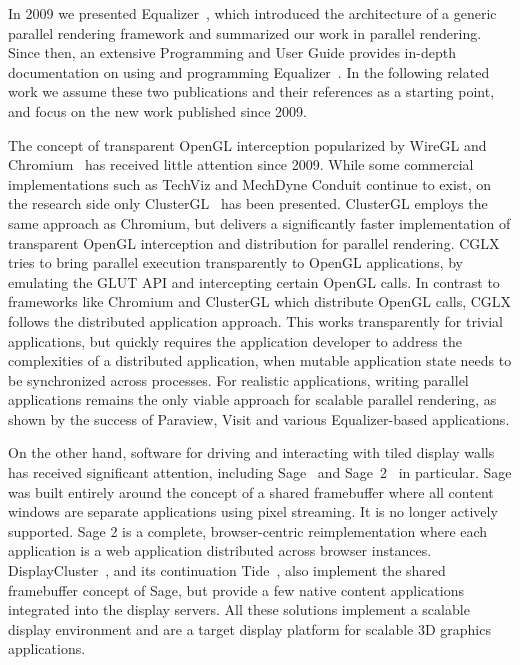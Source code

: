 \documentclass[10pt,journal,compsoc]{IEEEtran}
\begin{document}
In 2009 we presented \textsf{Equalizer}~\cite{EMP:09}, which introduced the
architecture of a generic parallel rendering framework and summarized our work
in parallel rendering. Since then, an extensive Programming and User Guide
provides in-depth documentation on using and programming
\textsf{Equalizer}~\cite{Eilemann:13}. In the following related work we assume
these two publications and their references as a starting point, and focus on
the new work published since 2009.

The concept of transparent OpenGL interception popularized by \textsf{WireGL}
and \textsf{Chromium}~\cite{HHNFAKK:02} has received little attention since
2009. While some commercial implementations such as \textsf{TechViz} and
\textsf{MechDyne Conduit} continue to exist, on the research side only
\textsf{ClusterGL}~\cite{NHM:11} has been presented. \textsf{ClusterGL} employs
the same approach as \textsf{Chromium}, but delivers a significantly faster
implementation of transparent OpenGL interception and distribution for parallel
rendering. \textsf{CGLX}~\cite{DK:11} tries to bring parallel execution
transparently to OpenGL applications, by emulating the GLUT API and intercepting
certain OpenGL calls. In contrast to frameworks like \textsf{Chromium} and
\textsf{ClusterGL} which distribute OpenGL calls, \textsf{CGLX} follows the
distributed application approach. This works transparently for trivial
applications, but quickly requires the application developer to address the
complexities of a distributed application, when mutable application state needs
to be synchronized across processes. For realistic applications, writing
parallel applications remains the only viable approach for scalable parallel
rendering, as shown by the success of \textsf{Paraview}, \textsf{Visit} and
various \textsf{Equalizer}-based applications.

On the other hand, software for driving and interacting with tiled display walls
has received significant attention, including \textsf{Sage}~\cite{Sage} and
\textsf{Sage~2}~\cite{Sage2} in particular. \textsf{Sage} was built entirely
around the concept of a shared framebuffer where all content windows are
separate applications using pixel streaming. It is no longer actively supported.
\textsf{Sage 2} is a complete, browser-centric reimplementation where each
application is a web application distributed across browser instances.
\textsf{DisplayCluster}~\cite{DC}, and its continuation
\textsf{Tide}~\cite{tide}, also implement the shared framebuffer concept of
\textsf{Sage}, but provide a few native content applications integrated into the
display servers. All these solutions implement a scalable display environment and
are a target display platform for scalable 3D graphics applications.
\end{document}
